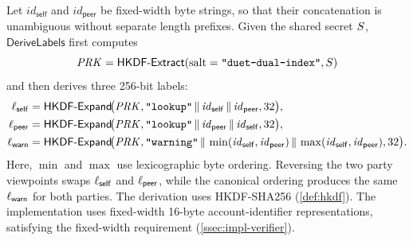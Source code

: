 \begin{definition}\label{def:dualindex-derive}
Let $\mathit{id}_{\mathsf{self}}$ and $\mathit{id}_{\mathsf{peer}}$ be fixed-width byte strings, so that
their concatenation is unambiguous without separate length prefixes. Given the shared secret
$S$, $\mathsf{DeriveLabels}$ first computes
\[
\mathit{PRK}
=
\mathsf{HKDF\text{-}Extract}(\text{salt}=\text{\texttt{"duet-dual-index"}},S)
\]
and then derives three 256-bit labels:
\begin{align*}
\ell_{\mathsf{self}}
&=
\mathsf{HKDF\text{-}Expand}\!\bigl(
\mathit{PRK},
\text{\texttt{"lookup"}}\,\|\,
\mathit{id}_{\mathsf{self}}\,\|\,
\mathit{id}_{\mathsf{peer}},
32
\bigr),\\
\ell_{\mathsf{peer}}
&=
\mathsf{HKDF\text{-}Expand}\!\bigl(
\mathit{PRK},
\text{\texttt{"lookup"}}\,\|\,
\mathit{id}_{\mathsf{peer}}\,\|\,
\mathit{id}_{\mathsf{self}},
32
\bigr),\\
\ell_{\mathsf{warn}}
&=
\mathsf{HKDF\text{-}Expand}\!\bigl(
\mathit{PRK},
\text{\texttt{"warning"}}\,\|\,
\min(\mathit{id}_{\mathsf{self}},\mathit{id}_{\mathsf{peer}})\,\|\,
\max(\mathit{id}_{\mathsf{self}},\mathit{id}_{\mathsf{peer}}),
32
\bigr).
\end{align*}
Here, $\min$ and $\max$ use lexicographic byte ordering. Reversing the two party viewpoints swaps
$\ell_{\mathsf{self}}$ and $\ell_{\mathsf{peer}}$, while the canonical ordering produces the same $\ell_{\mathsf{warn}}$ for both
parties. The derivation uses HKDF-SHA256 (\cref{def:hkdf}). The implementation uses fixed-width 16-byte
account-identifier representations, satisfying the fixed-width requirement
(\cref{ssec:impl-verifier}).
\end{definition}

